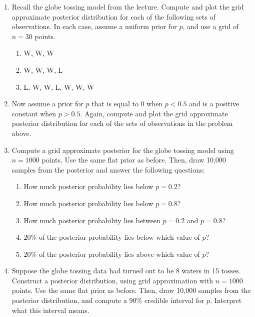 \documentclass[10pt]{article}
\begin{document}
\begin{enumerate}
  
\item Recall the globe tossing model from the lecture.  Compute and plot the grid approximate posterior distribution for each of the following sets of observations.  In each case, assume a uniform prior for $p$, and use a grid of $n=30$ points.
  \begin{enumerate}
  \item W, W, W
  \item W, W, W, L
  \item L, W, W, L, W, W, W
  \end{enumerate}

\item Now assume a prior for $p$ that is equal to 0 when $p<0.5$ and is a positive constant when $p>0.5$.  Again, compute and plot the grid approximate posterior distribution for each of the sets of observations in the problem above.

\item Compute a grid approximate posterior for the globe tossing model using $n=1000$ points.  Use the same flat prior as before.  Then, draw 10,000 samples from the posterior and answer the following questions:
  \begin{enumerate}
  \item How much posterior probability lies below $p=0.2$?
  \item How much posterior probability lies below $p=0.8$?
  \item How much posterior probability lies between $p=0.2$ and $p=0.8$?
  \item 20\% of the posterior probability lies below which value of $p$?
    \item 20\% of the posterior probability lies above which value of $p$? 
    \end{enumerate}

 \item Suppose the globe tossing data had turned out to be 8 waters in 15 tosses.  Construct a posterior distribution, using grid approximation with $n=1000$ points.  Use the same flat prior as before.  Then, draw 10,000 samples from the posterior distribution, and compute a 90\% credible interval for $p$.  Interpret what this interval means.
\end{enumerate}  
\end{document}
